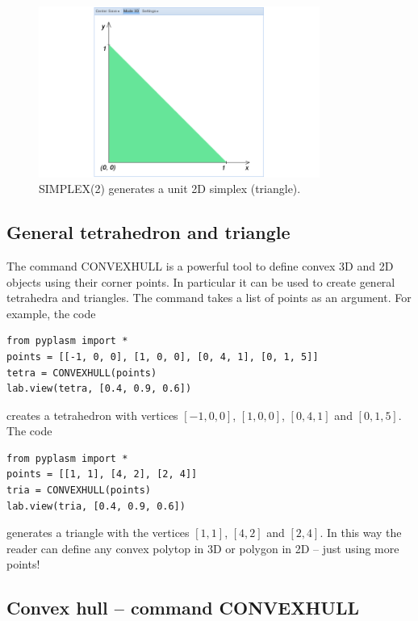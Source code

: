 \documentclass[article,A4,12pt]{llncs}
\begin{document}
\begin{figure}[!ht]
\begin{center}
\includegraphics[width=0.82\textwidth]{img/simplex-2.png}
\end{center}
\vspace{-2mm}
\caption{SIMPLEX(2) generates a unit 2D simplex (triangle).}
\label{fig:simplex-2}
\vspace{-1cm}
\end{figure}

\subsection{General tetrahedron and triangle}

The command CONVEXHULL is a powerful tool to define convex 3D and 2D objects using 
their corner points. In particular it can be used to create general tetrahedra and 
triangles. The command takes a list of points as an argument. For example, the code

\begin{verbatim}
from pyplasm import *
points = [[-1, 0, 0], [1, 0, 0], [0, 4, 1], [0, 1, 5]]
tetra = CONVEXHULL(points)
lab.view(tetra, [0.4, 0.9, 0.6])
\end{verbatim}
creates a tetrahedron with vertices $[-1, 0, 0]$, $[1, 0, 0]$, $[0, 4, 1]$ and $[0, 1, 5]$.
The code

\begin{verbatim}
from pyplasm import *
points = [[1, 1], [4, 2], [2, 4]]
tria = CONVEXHULL(points)
lab.view(tria, [0.4, 0.9, 0.6])
\end{verbatim}
generates a triangle with the vertices $[1, 1]$, $[4, 2]$ and $[2, 4]$. In this way 
the reader can define any convex polytop in 3D or polygon in 2D -- just using more 
points!

\subsection{Convex hull -- command CONVEXHULL}
\end{document}
